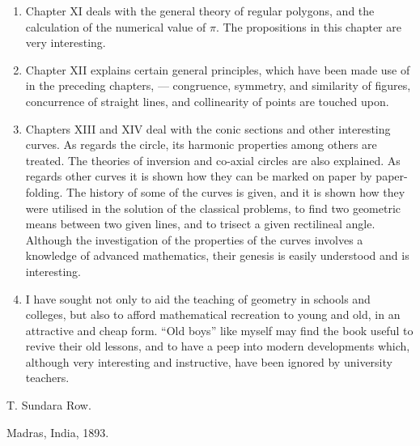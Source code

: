 \begin{enumerate}
    \item Chapter XI deals with the general theory of regular polygons, and the
        calculation of the numerical value of $\pi$. The propositions in this
        chapter are very interesting.

    \item Chapter XII explains certain general principles, which have been made
        use of in the preceding chapters, --- congruence, symmetry, and
        similarity of figures, concurrence of straight lines, and collinearity
        of points are touched upon.

    \item Chapters XIII and XIV deal with the conic sections and other
        interesting curves. As regards the circle, its harmonic properties among
        others are treated.  The theories of inversion and co-axial circles are
        also explained.  As regards other curves it is shown how they can be
        marked on paper by paper-folding.  The history of some of the curves is
        given, and it is shown how they were utilised in the solution of the
        classical problems, to find two geometric means between two given lines,
        and to trisect a given rectilineal angle.  Although the investigation of
        the properties of the curves involves a knowledge of advanced
        mathematics, their genesis is easily understood and is interesting.

    \item I have sought not only to aid the teaching of geometry in schools and
        colleges, but also to afford mathematical recreation to young and old,
        in an attractive and cheap form. ``Old boys'' like myself may find the
        book useful to revive their old lessons, and to have a peep into modern
        developments which, although very interesting and instructive, have been
        ignored by university teachers.

\end{enumerate}

\begin{flushright}
{\large T. Sundara Row.\mbox\qquad}\\
\end{flushright}
Madras, India, 1893.

